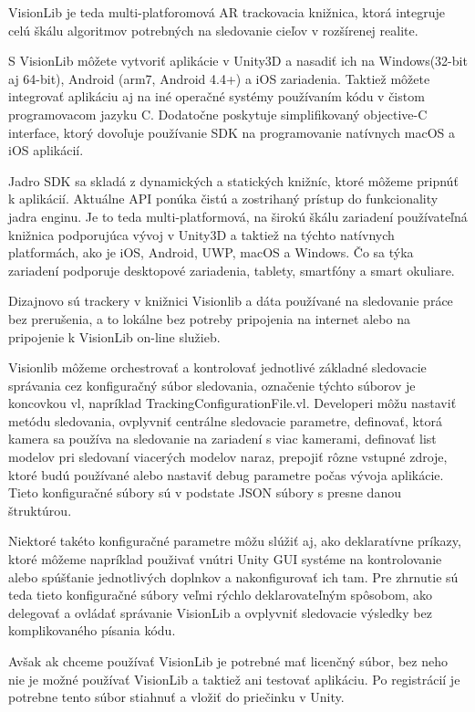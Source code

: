 VisionLib je teda multi-platforomová AR trackovacia knižnica, ktorá integruje celú škálu algoritmov potrebných na sledovanie cieľov v rozšírenej realite.  

S VisionLib môžete vytvoriť aplikácie v Unity3D a nasadiť ich na Windows(32-bit aj 64-bit), Android (arm7, Android 4.4+) a iOS zariadenia. Taktiež môžete integrovať aplikáciu aj na iné operačné systémy používaním kódu v čistom programovacom jazyku C. Dodatočne poskytuje simplifikovaný objective-C interface, ktorý dovoľuje používanie SDK na programovanie natívnych macOS a iOS aplikácií. 

Jadro SDK sa skladá z dynamických a statických knižníc, ktoré môžeme pripnúť k aplikácií. Aktuálne API ponúka čistú a zostrihaný prístup do funkcionality jadra enginu. Je to teda multi-platformová, na širokú škálu zariadení používateľná knižnica podporujúca vývoj v Unity3D a taktiež na týchto natívnych platformách, ako je iOS, Android, UWP, macOS a Windows. Čo sa týka zariadení podporuje desktopové zariadenia, tablety, smartfóny a smart okuliare. 

Dizajnovo sú trackery v knižnici Visionlib a dáta používané na sledovanie práce bez prerušenia, a to lokálne bez potreby pripojenia na internet alebo na pripojenie k VisionLib on-line služieb.

Visionlib môžeme orchestrovať a kontrolovať jednotlivé základné sledovacie správania cez konfiguračný súbor sledovania, označenie týchto súborov je koncovkou vl, napríklad TrackingConfigurationFile.vl. Developeri môžu nastaviť metódu sledovania, ovplyvniť centrálne sledovacie parametre, definovať, ktorá kamera sa používa na sledovanie na zariadení s viac kamerami, definovať list modelov pri sledovaní viacerých modelov naraz, prepojiť rôzne vstupné zdroje, ktoré budú používané alebo nastaviť debug parametre počas vývoja aplikácie. Tieto konfiguračné súbory sú v podstate JSON súbory s presne danou štruktúrou.

Niektoré takéto konfiguračné parametre môžu slúžiť aj, ako deklaratívne príkazy, ktoré môžeme napríklad použivať vnútri Unity GUI systéme na kontrolovanie alebo spúšťanie jednotlivých doplnkov a nakonfigurovať ich tam. Pre zhrnutie sú teda tieto konfiguračné súbory veľmi rýchlo deklarovateľným spôsobom, ako delegovať a ovládať správanie VisionLib a ovplyvniť sledovacie výsledky bez komplikovaného písania kódu. 

Avšak ak chceme používať VisionLib je potrebné mať licenčný súbor, bez neho nie je možné používať VisionLib a taktiež ani testovať aplikáciu. Po registrácií je potrebne tento súbor stiahnuť a vložiť do priečinku v Unity. \cite{visionlib2023docs}

